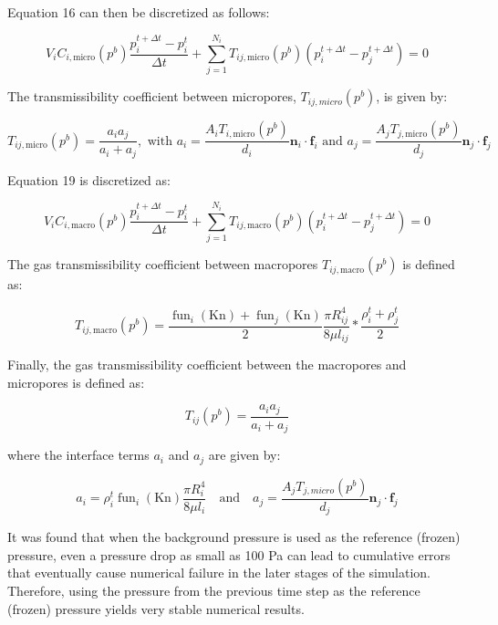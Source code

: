 \documentclass{article}
\begin{document}
Equation 16 can then be discretized as follows:

\begin{equation}
    V_{i} C_{i, \text{micro}}\left(p^{b}\right) \frac{p_{i}^{t+\Delta t}-p_i^{t}}{\Delta t}+\sum_{j=1}^{N_{i}} T_{i j, \text{micro}}\left(p^{b}\right)\left(p_{i}^{t+\Delta t}-p_{j}^{t+\Delta t}\right)=0
\end{equation}

The transmissibility coefficient between micropores, $T_{i j,micro}\left(p^{b}\right)$, is given by:

\begin{equation}
    T_{i j, \text{micro}}\left(p^{b}\right)=\frac{a_{i} a_{j}}{a_{i}+a_{j}}, \text{ with } a_{i}=\frac{A_{i} T_{i, \text{micro}}\left(p^{b}\right)}{d_{i}} \mathbf{n}_{i} \cdot \mathbf{f}_{i} \text{ and } a_{j}=\frac{A_{j} T_{j, \text{micro}}\left(p^{b}\right)}{d_{j}} \mathbf{n}_{j} \cdot \mathbf{f}_{j}
\end{equation}

Equation 19 is discretized as:

\begin{equation}
    V_{i} C_{i, \text{macro}}\left(p^{b}\right) \frac{p_{i}^{t+\Delta t}-p_i^{t}}{\Delta t}+\sum_{j=1}^{N_{i}} T_{i j, \text{macro}}\left(p^{b}\right)\left(p_{i}^{t+\Delta t}-p_{j}^{t+\Delta t}\right)=0
\end{equation}

The gas transmissibility coefficient  between macropores $T_{i j, \text{macro}}\left(p^{b}\right)$ is defined as:

\begin{equation}
    T_{i j, \text{macro}}\left(p^{b}\right)=\frac{\operatorname{fun}_{i}(\mathrm{Kn})+\operatorname{fun}_{j}(\mathrm{Kn})}{2} \frac{\pi R_{i j}^{4}}{8 \mu l_{i j}} * \frac{\rho_{i}^{t}+\rho_{j}^{t}}{2}
\end{equation}

Finally, the gas transmissibility coefficient between the macropores and micropores is defined as:

\begin{equation}
    T_{i j}\left(p^{b}\right)=\frac{a_{i} a_{j}}{a_{i}+a_{j}}
\end{equation}

where the interface terms $a_i$ and $a_j$ are given by:

\begin{equation}
    a_{i}=\rho_{i}^{t} \operatorname{fun}_{i}(\mathrm{Kn}) \frac{\pi R_{i}^{4}}{8 \mu l_{i}} \quad \text{and} \quad a_{j}=\frac{A_{j} T_{j, micro}\left(p^{b}\right)}{d_{j}} \mathbf{n}_{j} \cdot \mathbf{f}_{j}
\end{equation}

It was found that when the background pressure is used as the reference (frozen) pressure, even a pressure drop as small as 100 Pa can lead to cumulative errors that eventually cause numerical failure in the later stages of the simulation. Therefore, using the pressure from the previous time step as the reference (frozen) pressure yields very stable numerical results.
\end{document}
